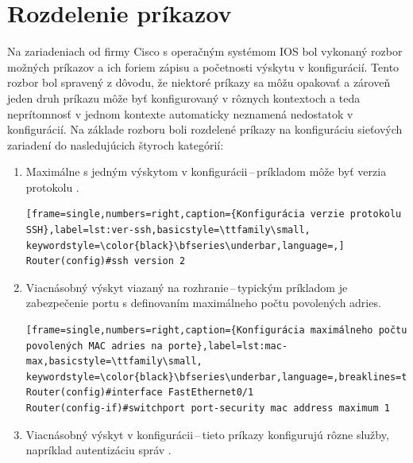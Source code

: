 \newpage
\section{Rozdelenie príkazov}
Na zariadeniach od firmy Cisco s operačným systémom IOS bol vykonaný rozbor možných príkazov a ich foriem zápisu a početnosti výskytu v konfigurácií. Tento rozbor bol spravený z dôvodu, že niektoré príkazy sa môžu opakovať a zároveň jeden druh príkazu môže byť konfigurovaný v rôznych kontextoch a teda neprítomnosť v jednom kontexte automaticky neznamená nedostatok v konfigurácií. Na základe rozboru boli rozdelené príkazy na konfiguráciu sieťových zariadení do nasledujúcich štyroch kategórií:
\\
\begin{enumerate}
	\item Maximálne s jedným výskytom v konfigurácii\,--\,príkladom môže byť verzia protokolu .
	
\begin{minipage}{\linewidth}		
\begin{lstlisting}[frame=single,numbers=right,caption={Konfigurácia verzie protokolu SSH},label=lst:ver-ssh,basicstyle=\ttfamily\small, keywordstyle=\color{black}\bfseries\underbar,language=,]
Router(config)#ssh version 2
\end{lstlisting}
\end{minipage}
	
	\item \vspace{2em} Viacnásobný výskyt viazaný na rozhranie\,--\,typickým príkladom je zabezpečenie portu s definovaním maximálneho počtu povolených  adries.
	
\begin{minipage}{\linewidth}		
\begin{lstlisting}[frame=single,numbers=right,caption={Konfigurácia maximálneho počtu povolených MAC adries na porte},label=lst:mac-max,basicstyle=\ttfamily\small, keywordstyle=\color{black}\bfseries\underbar,language=,breaklines=true]
Router(config)#interface FastEthernet0/1
Router(config-if)#switchport port-security mac address maximum 1
\end{lstlisting}
\end{minipage}

	\item \vspace{2em} Viacnásobný výskyt v konfigurácii\,--\,tieto príkazy konfigurujú rôzne služby, napríklad autentizáciu správ .


\end{enumerate}
